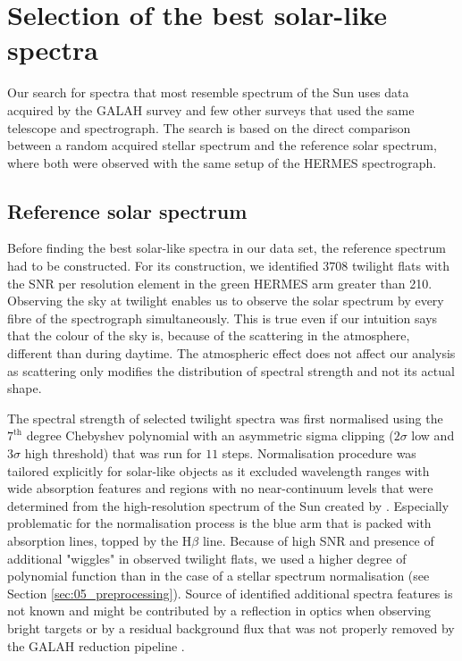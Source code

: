 
\section{Selection of the best solar-like spectra}
\label{sec:05_selection}
Our search for spectra that most resemble spectrum of the Sun uses data acquired by the GALAH survey and few other surveys that used the same telescope and spectrograph. The search is based on the direct comparison between a random acquired stellar spectrum and the reference solar spectrum, where both were observed with the same setup of the HERMES spectrograph.

\subsection{Reference solar spectrum}
\label{sec:05_reference}
Before finding the best solar-like spectra in our data set, the reference spectrum had to be constructed. For its construction, we identified $3708$ twilight flats with the SNR per resolution element in the green HERMES arm greater than 210. Observing the sky at twilight enables us to observe the solar spectrum by every fibre of the spectrograph simultaneously. This is true even if our intuition says that the colour of the sky is, because of the scattering in the atmosphere, different than during daytime. The atmospheric effect does not affect our analysis as scattering only modifies the distribution of spectral strength and not its actual shape.

The spectral strength of selected twilight spectra was first normalised using the $7^\text{th}$ degree Chebyshev polynomial with an asymmetric sigma clipping ($2\sigma$ low and $3\sigma$ high threshold) that was run for $11$ steps. Normalisation procedure was tailored explicitly for solar-like objects as it excluded wavelength ranges with wide absorption features and regions with no near-continuum levels that were determined from the high-resolution spectrum of the Sun created by \citet{2005MSAIS...8..189K}. Especially problematic for the normalisation process is the blue arm that is packed with absorption lines, topped by the H$\beta$ line. Because of high SNR and presence of additional "wiggles" in observed twilight flats, we used a higher degree of polynomial function than in the case of a stellar spectrum normalisation (see Section \ref{sec:05_preprocessing}). Source of identified additional spectra features is not known and might be contributed by a reflection in optics when observing bright targets or by a residual background flux that was not properly removed by the GALAH reduction pipeline \cite{2017MNRAS.464.1259K}.

